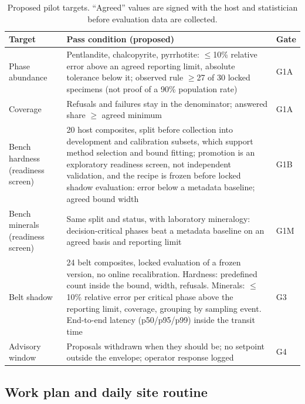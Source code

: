 \documentclass[10pt,a4paper,twocolumn]{article}
\begin{document}
\begin{table}[t]
\centering\footnotesize
\caption{Proposed pilot targets. ``Agreed'' values are signed with the host and statistician before evaluation data are collected.}
\label{tab:goals}
\begin{tabularx}{\columnwidth}{@{}L{1.45cm}YL{0.75cm}@{}}
\toprule
Target & Pass condition (proposed) & Gate \\
\midrule
Phase abundance & Pentlandite, chalcopyrite, pyrrhotite: $\leq$10\% relative error above an agreed reporting limit, absolute tolerance below it; observed rule $\geq$27 of 30 locked specimens (not proof of a 90\% population rate) & G1A \\
Coverage & Refusals and failures stay in the denominator; answered share $\geq$ agreed minimum & G1A \\
Bench hardness (readiness screen) & 20 host composites, split before collection into development and calibration subsets, which support method selection and bound fitting; promotion is an exploratory readiness screen, not independent validation, and the recipe is frozen before locked shadow evaluation: error below a metadata baseline; agreed bound width & G1B \\
Bench minerals (readiness screen) & Same split and status, with laboratory mineralogy: decision-critical phases beat a metadata baseline on an agreed basis and reporting limit & G1M \\
Belt shadow & 24 belt composites, locked evaluation of a frozen version, no online recalibration. Hardness: predefined count inside the bound, width, refusals. Minerals: $\leq$10\% relative error per critical phase above the reporting limit, coverage, grouping by sampling event. End-to-end latency (p50/p95/p99) inside the transit time & G3 \\
Advisory window & Proposals withdrawn when they should be; no setpoint outside the envelope; operator response logged & G4 \\
\bottomrule
\end{tabularx}
\end{table}

\subsection{Work plan and daily site routine}
\end{document}
